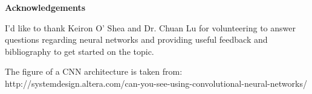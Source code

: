 \thispagestyle{empty}

\begin{center}
    {\LARGE\bf Acknowledgements}
\end{center}

I'd like to thank Keiron O' Shea and Dr. Chuan Lu for volunteering to answer questions regarding neural networks and providing useful feedback and bibliography to get started on the topic.

The figure of a CNN architecture is taken from:
http://systemdesign.altera.com/can-you-see-using-convolutional-neural-networks/